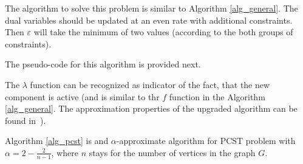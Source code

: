 \documentclass[11pt, tightenlines, twoside, onecolumn, nofloats, nobibnotes, nofootinbib, superscriptaddress, noshowpacks, centertags]{revtex4}
\begin{document}
The algorithm to solve this problem is similar to Algorithm \ref{alg_general}. The dual variables should be updated at an even rate with additional constraints. Then $\varepsilon$ will take the minimum of two values (according to the both groups of constraints).

The pseudo-code for this algorithm is provided next.

The $\lambda$ function can be recognized as indicator of the fact, that the new component is active (and is similar to thr $f$ function in the Algorithm \ref{alg_general}. The approximation properties of the upgraded algorithm can be found in~\cite{goemans1995general}).

\begin{theorem}
    Algorithm \ref{alg_pcst} is and $\alpha$-approximate algorithm for $\text{PCST}$ problem with $\alpha = 2 - \frac{2}{n-1}$, where $n$ stays for the number of vertices in the graph $G$.
    \label{theorem3}
\end{theorem}
\end{document}
